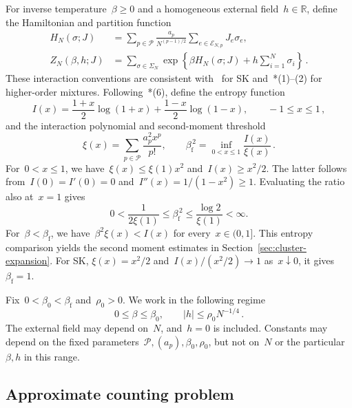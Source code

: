 \documentclass[letterpaper,11pt,reqno]{amsart}
\renewcommand{\leq}{\leqslant}
\renewcommand{\geq}{\geqslant}
\begin{document}
For inverse temperature~$\beta\geq0$ and a homogeneous external field~$h\in\mathbb R$, define the Hamiltonian and partition function
\begin{align}
H_N(\sigma;J)&=\sum_{p\in\mathcal P}\frac{a_p}{N^{(p-1)/2}}\sum_{e\in\mathcal E_{N,p}}J_e\sigma_e,\label{eq:hamiltonian}\\
Z_N(\beta,h;J)&=\sum_{\sigma\in\Sigma_N}\exp\!\left\{\beta H_N(\sigma;J)+h\sum_{i=1}^N\sigma_i\right\}\,.\label{eq:partition}
\end{align}
These interaction conventions are consistent with~\cite{DW23} for SK and~\cite{DW26}*{(1)--(2)} for higher-order mixtures. Following~\cite{DW26}*{(6)}, define the entropy function
\begin{equation}\label{eq:sign-entropy}
I(x)=\frac{1+x}{2}\log(1+x)+\frac{1-x}{2}\log(1-x),\qquad -1\leq x\leq1\,,
\end{equation}
 and the interaction polynomial and second-moment threshold
\begin{equation}\label{eq:graphical-threshold}
\xi(x)=\sum_{p\in\mathcal P}\frac{a_p^2x^p}{p!},\qquad
\beta_{\mathrm f}^{\,2}=\inf_{0<x\leq1}\frac{I(x)}{\xi(x)}\,.
\end{equation}
For~$0<x\leq1$, we have~$\xi(x)\leq\xi(1)x^2$ and~$I(x)\geq x^2/2$. The latter follows from~$I(0)=I'(0)=0$ and~$I''(x)=1/(1-x^2)\geq1$. Evaluating the ratio also at~$x=1$ gives
\begin{equation*}
0<\frac{1}{2\xi(1)}\leq\beta_{\mathrm f}^{\,2}\leq\frac{\log2}{\xi(1)}<\infty.
\end{equation*}
For~$\beta<\beta_{\mathrm f}$, we have~$\beta^2\xi(x)<I(x)$ for every~$x\in(0,1]$. This entropy comparison yields the second moment estimates in Section~\ref{sec:cluster-expansion}. For SK, $\xi(x)=x^2/2$ and~$I(x)/(x^2/2)\to1$ as~$x\downarrow0$, it gives~$\beta_{\mathrm f}=1$.

Fix~$0<\beta_0<\beta_{\mathrm f}$ and~$\rho_0>0$. We work in the following regime
\begin{equation}\label{eq:field-range}
0\leq\beta\leq\beta_0,\qquad |h|\leq\rho_0N^{-1/4}\,.
\end{equation}
The external field may depend on~$N$, and~$h=0$ is included. Constants may depend on the fixed parameters~$\mathcal P,(a_p),\beta_0,\rho_0$, but not on~$N$ or the particular~$\beta,h$ in this range.

\subsection{Approximate counting problem}\label{subsec:problem}
\end{document}
